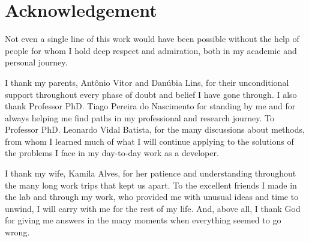 \chapter*{Acknowledgement}

Not even a single line of this work would have been possible without the help of people for whom I hold deep respect and admiration, both in my academic and personal journey.

I thank my parents, Antônio Vitor and Danúbia Lins, for their unconditional support throughout every phase of doubt and belief I have gone through. I also thank Professor PhD. Tiago Pereira do Nascimento for standing by me and for always helping me find paths in my professional and research journey. To Professor PhD. Leonardo Vidal Batista, for the many discussions about methods, from whom I learned much of what I will continue applying to the solutions of the problems I face in my day-to-day work as a developer.

I thank my wife, Kamila Alves, for her patience and understanding throughout the many long work trips that kept us apart. To the excellent friends I made in the lab and through my work, who provided me with unusual ideas and time to unwind, I will carry with me for the rest of my life. And, above all, I thank God for giving me answers in the many moments when everything seemed to go wrong.

\cleardoublepage